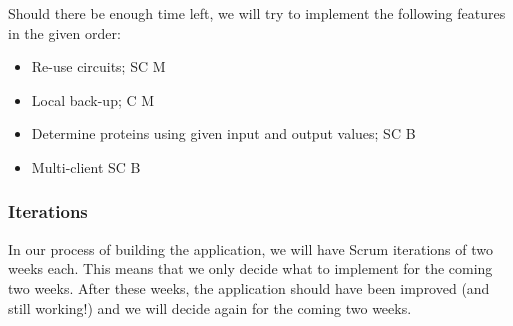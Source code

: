 \documentclass[a4paper]{article}
\begin{document}
Should there be enough time left, we will try to implement the following features in the given order:
\begin{itemize}
\item Re-use circuits;											\tabto{13.8cm} SC \tabto{14.6cm} M
\item Local back-up;											\tabto{13.8cm}  C \tabto{14.6cm} M
\item Determine proteins using given input and output values;	\tabto{13.8cm} SC \tabto{14.6cm} B
\item Multi-client												\tabto{13.8cm} SC \tabto{14.6cm} B
\end{itemize}

\subsubsection{Iterations}
In our process of building the application, we will have Scrum iterations of two weeks each. This means that we only decide what to implement for the coming two weeks. After these weeks, the application should have been improved (and still working!) and we will decide again for the coming two weeks. \\
\end{document}

